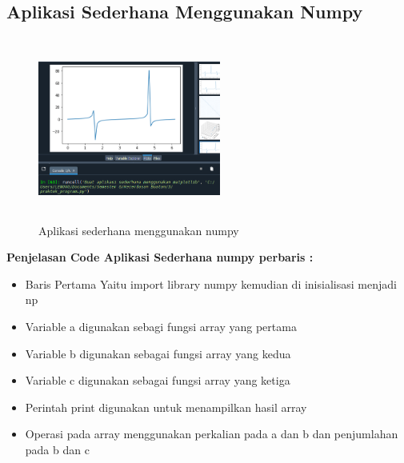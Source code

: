 \subsection{Aplikasi Sederhana Menggunakan Numpy}
\begin{figure}[!htbp]
    \centering
    \includegraphics[width=6cm,height=6cm]{figures/Cp3-3.png}
    \caption{Aplikasi sederhana menggunakan numpy}
    \label{penanda}
\end{figure}
\textbf{Penjelasan Code Aplikasi Sederhana numpy perbaris :}
\begin{itemize}
    \item Baris Pertama Yaitu import library numpy kemudian di inisialisasi menjadi np
    \item Variable a digunakan sebagi fungsi array yang pertama
    \item Variable b digunakan sebagai fungsi array yang kedua
    \item Variable c digunakan sebagai fungsi array yang ketiga
    \item Perintah print digunakan untuk menampilkan hasil array
    \item Operasi pada array menggunakan perkalian pada a dan b dan penjumlahan pada b dan c
\end{itemize}


